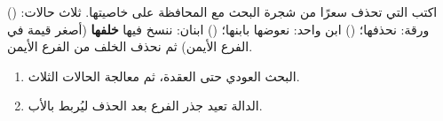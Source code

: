 \begin{statement}
اكتب  التي تحذف سعرًا من شجرة البحث مع المحافظة على خاصيتها. ثلاث حالات: () ورقة: نحذفها؛ () ابن واحد: نعوضها بابنها؛ () ابنان: ننسخ فيها \textbf{خلفها} (أصغر قيمة في الفرع الأيمن) ثم نحذف الخلف من الفرع الأيمن.
\end{statement}
\begin{stepsbox}\begin{enumerate}
\item البحث العودي حتى العقدة، ثم معالجة الحالات الثلاث.
\item الدالة تعيد جذر الفرع بعد الحذف ليُربط بالأب.
\end{enumerate}\end{stepsbox}
